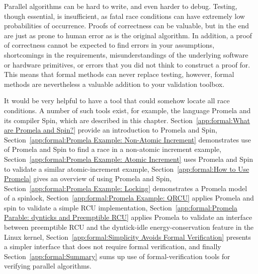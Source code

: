 


Parallel algorithms can be hard to write, and even harder to debug.
Testing, though essential, is insufficient, as fatal race conditions
can have extremely low probabilities of occurrence.
Proofs of correctness can be valuable, but in the end are just as
prone to human error as is the original algorithm.
In addition, a proof of correctness cannot be expected to find errors
in your assumptions, shortcomings in the requirements,
misunderstandings of the underlying software or hardware primitives,
or errors that you did not think to construct a proof for.
This means that formal methods can never replace testing, however,
formal methods are nevertheless a valuable addition to your validation toolbox.

It would be very helpful to have a tool that could somehow locate
all race conditions.
A number of such tools exist, for example,
the language Promela and its compiler Spin, which are described in
this chapter.
Section~\ref{app:formal:What are Promela and Spin?} provide an
introduction to Promela and Spin,
Section~\ref{app:formal:Promela Example: Non-Atomic Increment}
demonstrates use of Promela and Spin to find a race in a non-atomic increment
example,
Section~\ref{app:formal:Promela Example: Atomic Increment}
uses Promela and Spin to validate a similar atomic-increment example,
Section~\ref{app:formal:How to Use Promela}
gives an overview of using Promela and Spin,
Section~\ref{app:formal:Promela Example: Locking}
demonstrates a Promela model of a spinlock,
Section~\ref{app:formal:Promela Example: QRCU}
applies Promela and spin to validate a simple RCU implementation,
Section~\ref{app:formal:Promela Parable: dynticks and Preemptible RCU}
applies Promela to validate an interface between preemptible RCU and
the dyntick-idle energy-conservation feature in the Linux kernel,
Section~\ref{app:formal:Simplicity Avoids Formal Verification}
presents a simpler interface that does not require formal verification,
and finally
Section~\ref{app:formal:Summary}
sums up use of formal-verification tools for verifying parallel algorithms.





